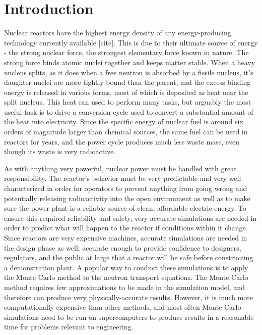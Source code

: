 \chapter{Introduction}

Nuclear reactors have the highest energy density of any energy-producing technology currently available [cite].  This is due to their ultimate source of energy - the strong nuclear force, the strongest elementary force known in nature. The strong force binds atomic nuclei together and keeps matter stable.  When a heavy nucleus splits, as it does when a free neutron is absorbed by a fissile nucleus, it's daughter nuclei are more tightly bound than the parent, and the excess binding energy is released in various forms, most of which is deposited as heat near the split nucleus.  This heat can used to perform many tasks, but arguably the most useful task is to drive a conversion cycle used to convert a substantial amount of the heat into electricity.  Since the specific energy of nuclear fuel is around six orders of magnitude larger than chemical sources, the same fuel can be used in reactors for years, and the power cycle produces much less waste mass, even though its waste is very radioactive.  

As with anything very powerful, nuclear power must be handled with great responsibility.  The reactor's behavior must be very predictable and very well characterized in order for operators to prevent anything from going wrong and potentially releasing radioactivity into the open environment as well as to make sure the power plant is a reliable source of clean, affordable electric energy.  To ensure this required reliability and safety, very accurate simulations are needed in order to predict what will happen to the reactor if conditions within it change.  Since reactors are very expensive machines, accurate simulations are needed in the design phase as well; accurate enough to provide confidence to designers, regulators, and the public at large that a reactor will be safe before constructing a demonstration plant.  A popular way to conduct these simulations is to apply the Monte Carlo method to the neutron transport equations.  The Monte Carlo method requires few approximations to be made in the simulation model, and therefore can produce very physically-accurate results.  However, it is much more computationally expensive than other methods, and most often Monte Carlo simulations need to be run on supercomputers to produce results in a reasonable time for problems relevant to engineering.

